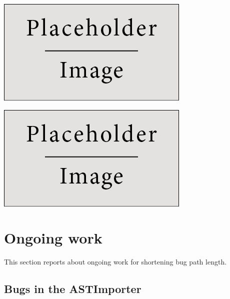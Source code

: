 \documentclass[a0,portrait]{a0poster}
\begin{document}
\begin{multicols}{2}
\begin{center}\vspace{1cm}
\includegraphics[width=0.8\linewidth]{placeholder}
\end{center}\vspace{1cm}

\begin{center}\vspace{1cm}
\includegraphics[width=0.8\linewidth]{placeholder}
\end{center}\vspace{1cm}


\section*{Ongoing work}

This section reports about ongoing work for shortening bug path length. 


\subsection*{Bugs in the ASTImporter}


\end{multicols}
\end{document}
